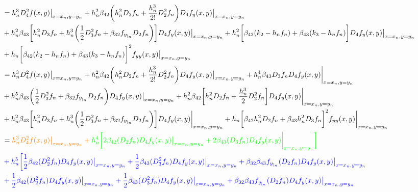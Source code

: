 \documentclass[12 pt]{article}
\begin{document}
\begin{align*}
	&= h_{n}^{3}D_{4}^{2}f(x,y)\big\vert_{x = x_{n}, y= y_{n}} +  h_{n}^{2}\beta_{42}\bigg(h_{n}^{2}D_{2}f_{n}+\frac{h_{n}^{3}}{2!}D_{2}^{2}f_{n}\bigg)D_{4}f_{y}(x,y)\big\vert_{x = x_{n}, y= y_{n}} \\
	&+ h_{n}^{2}\beta_{43}\bigg[h_{n}^{2}D_{3}f_{n}+ h_{n}^{3}\bigg(\frac{1}{2}D_{3}^{2}f_{n}+\beta_{32}f_{y_{|_{n}}}D_{2}f_{n}\bigg)\bigg]D_{4}f_{y}(x,y)\big\vert_{x = x_{n}, y= y_{n}} + h_{n}^{2}\bigg[\beta_{42}(k_{2}- h_{n}f_{n}) + \beta_{43}(k_{3}-h_{n}f_{n})\bigg]D_{4}f_{y}(x,y)\big\vert_{x = x_{n}, y= y_{n}}\\
	&+ h_{n}\bigg[\beta_{42}(k_{2}-h_{n}f_{n}) + \beta_{43}(k_{3}-h_{n}f_{n})\bigg]^{2}f_{yy}(x,y)\big\vert_{x = x_{n}, y= y_{n}}\\
	&= h_{n}^{3}D_{4}^{2}f(x,y)\big\vert_{x = x_{n}, y= y_{n}} +  h_{n}^{2}\beta_{42}\bigg(h_{n}^{2}D_{2}f_{n}+\frac{h_{n}^{3}}{2!}D_{2}^{2}f_{n}\bigg)D_{4}f_{y}(x,y)\big\vert_{x = x_{n}, y= y_{n}} + h_{n}^{4}\beta_{43}D_{3}f_{n}D_{4}f_{y}(x,y)\bigg\vert_{x=x_{n}, y= y_{n}}\\
	&+ h_{n}^{5}\beta_{43}\bigg(\frac{1}{2}D_{3}^{2}f_{n}+\beta_{32}f_{y_{|_{n}}}D_{2}f_{n}\bigg)D_{4}f_{y}(x,y)\big\vert_{x = x_{n}, y= y_{n}} + h_{n}^{2}\beta_{42}\bigg[h_{n}^{2}D_{2}f_{n} + \frac{h_{n}^{3}}{2}D_{2}^{2}f_{n}\bigg]D_{4}f_{y}(x,y)\bigg\vert_{x=x_{n}, y= y_{n}}\\
	&+ h_{n}^{2}\beta_{43}\bigg[h_{n}^{2}D_{3}f_{n}+h_{n}^{3}\bigg(\frac{1}{2}D_{3}^{2}f_{n}+\beta_{32}f_{y_{|_{n}}}D_{2}f_{n}\bigg)\bigg]D_{4}f_{y}(x,y)\bigg\vert_{x=x_{n}, y= y_{n}} + h_{n}\bigg[\beta_{42}h_{n}^{2}D_{2}f_{n} + \beta_{43}h_{n}^{2}D_{3}f_{n}\bigg]^{2}f_{yy}(x,y)\bigg\vert_{x=x_{n}, y= y_{n}}\\
	&= \color{orange}h_{n}^{3}D_{4}^{2}f(x,y)\big\vert_{x = x_{n}, y= y_{n}} + \color{green}h_{n}^{4}\bigg[2\beta_{42}(D_{2}f_{n})D_{4}f_{y}(x,y)\big\vert_{x = x_{n}, y= y_{n}} + 2\beta_{43}(D_{3}f_{n})D_{4}f_{y}(x,y)\bigg\vert_{x=x_{n}, y= y_{n}} \bigg]\\
	&\color{blue}+ h_{n}^{5}\bigg[\frac{1}{2}\beta_{42}(D_{2}^{2}f_{n})D_{4}f_{y}(x,y)\big\vert_{x = x_{n}, y= y_{n}} + \frac{1}{2}\beta_{43}(D_{3}^{2}f_{n})D_{4}f_{y}(x,y)\big\vert_{x = x_{n}, y= y_{n}} + \beta_{32}\beta_{43}f_{y_{|_{n}}}(D_{2}f_{n})D_{4}f_{y}(x,y)\big\vert_{x = x_{n}, y= y_{n}}\\
	&\color{blue}+\frac{1}{2}\beta_{42}(D_{2}^{2}f_{n})D_{4}f_{y}(x,y)\big\vert_{x = x_{n}, y= y_{n}} + \frac{1}{2}\beta_{43}(D_{3}^{2}f_{n})D_{4}f_{y}(x,y)\big\vert_{x = x_{n}, y= y_{n}} + \beta_{32}\beta_{43}f_{y_{|_{n}}}(D_{2}f_{n})D_{4}f_{y}(x,y)\big\vert_{x = x_{n}, y= y_{n}}\\

\end{align*}
\end{document}
